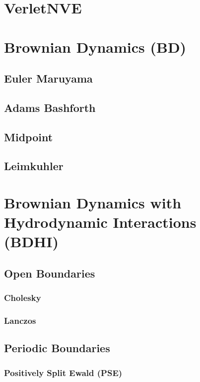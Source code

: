 \documentclass[ twoside,openright,titlepage,numbers=noenddot,%
headinclude,footinclude,cleardoublepage=empty,abstract=on,
BCOR=5mm,paper=a4,fontsize=11pt
]{scrreprt}
\begin{document}
\chapter{VerletNVE}

\chapter{Brownian Dynamics (BD)}

\section{Euler Maruyama}

\section{Adams Bashforth}

\section{Midpoint}

\section{Leimkuhler}

\chapter{Brownian Dynamics with Hydrodynamic Interactions (BDHI)}

\section{Open Boundaries}

\subsection{Cholesky}

\subsection{Lanczos}

\section{Periodic Boundaries}

\subsection{Positively Split Ewald (PSE)}
\end{document}
